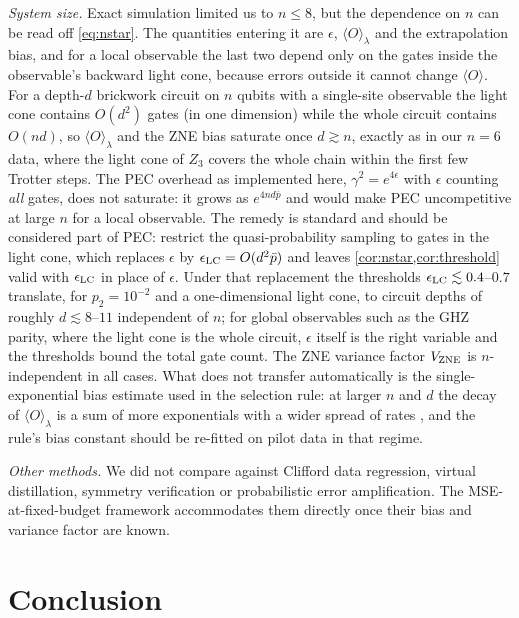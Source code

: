\documentclass[11pt,a4paper]{article}
\theoremstyle{remark}
\newcommand{\eps}{\epsilon}
\begin{document}
\emph{System size.} Exact simulation limited us to $n\le8$, but the dependence on $n$ can be read off \cref{eq:nstar}. The quantities entering it are $\eps$, $\langle O\rangle_\lambda$ and the extrapolation bias, and for a local observable the last two depend only on the gates inside the observable's backward light cone, because errors outside it cannot change $\langle O\rangle$. For a depth-$d$ brickwork circuit on $n$ qubits with a single-site observable the light cone contains $O(d^2)$ gates (in one dimension) while the whole circuit contains $O(nd)$, so $\langle O\rangle_\lambda$ and the ZNE bias saturate once $d\gtrsim n$, exactly as in our $n=6$ data, where the light cone of $Z_3$ covers the whole chain within the first few Trotter steps. The PEC overhead as implemented here, $\gamma^2=e^{4\eps}$ with $\eps$ counting \emph{all} gates, does not saturate: it grows as $e^{4nd\bar p}$ and would make PEC uncompetitive at large $n$ for a local observable. The remedy is standard and should be considered part of PEC: restrict the quasi-probability sampling to gates in the light cone, which replaces $\eps$ by $\eps_{\rm LC}=O(d^2\bar p)$ and leaves \cref{cor:nstar,cor:threshold} valid with $\eps_{\rm LC}$ in place of $\eps$. Under that replacement the thresholds $\eps_{\rm LC}\lesssim0.4$--$0.7$ translate, for $p_2=10^{-2}$ and a one-dimensional light cone, to circuit depths of roughly $d\lesssim8$--$11$ independent of $n$; for global observables such as the GHZ parity, where the light cone is the whole circuit, $\eps$ itself is the right variable and the thresholds bound the total gate count. The ZNE variance factor $V_{\rm ZNE}$ is $n$-independent in all cases. What does not transfer automatically is the single-exponential bias estimate used in the selection rule: at larger $n$ and $d$ the decay of $\langle O\rangle_\lambda$ is a sum of more exponentials with a wider spread of rates \cite{cai2021}, and the rule's bias constant should be re-fitted on pilot data in that regime.

\emph{Other methods.} We did not compare against Clifford data regression, virtual distillation, symmetry verification or probabilistic error amplification. The MSE-at-fixed-budget framework accommodates them directly once their bias and variance factor are known.

\section{Conclusion}
\end{document}

